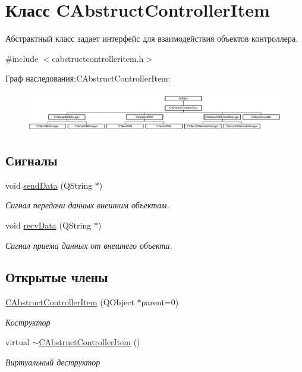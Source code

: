 \hypertarget{class_c_abstruct_controller_item}{}\section{Класс C\+Abstruct\+Controller\+Item}
\label{class_c_abstruct_controller_item}


Абстрактный класс задает интерфейс для взаимодействия объектов контроллера.  




{\ttfamily \#include $<$cabstructcontrolleritem.\+h$>$}

Граф наследования\+:C\+Abstruct\+Controller\+Item\+:\begin{figure}[H]
\begin{center}
\leavevmode
\includegraphics[height=1.720430cm]{class_c_abstruct_controller_item}
\end{center}
\end{figure}
\subsection*{Сигналы}
\begin{DoxyCompactItemize}
\item 
void \hyperlink{class_c_abstruct_controller_item_a7cf2bebc87a7d0b660318e946a176eb9}{send\+Data} (Q\+String $\ast$)
\begin{DoxyCompactList}\small\item\em Сигнал передачи данных внешним объектам. \end{DoxyCompactList}\item 
void \hyperlink{class_c_abstruct_controller_item_a6898e48061cb0cac2065f8193bd386c1}{recv\+Data} (Q\+String $\ast$)
\begin{DoxyCompactList}\small\item\em Сигнал приема данных от внешнего объекта. \end{DoxyCompactList}\end{DoxyCompactItemize}
\subsection*{Открытые члены}
\begin{DoxyCompactItemize}
\item 
\hyperlink{class_c_abstruct_controller_item_a1d99654a9522cc8721a329d1dcee35a4}{C\+Abstruct\+Controller\+Item} (Q\+Object $\ast$parent=0)
\begin{DoxyCompactList}\small\item\em Коструктор \end{DoxyCompactList}\item 
virtual \hyperlink{class_c_abstruct_controller_item_a807bca71bd9a2966e60ec5c3c807f359}{$\sim$\+C\+Abstruct\+Controller\+Item} ()
\begin{DoxyCompactList}\small\item\em Виртуальный деструктор \end{DoxyCompactList}\end{DoxyCompactItemize}
